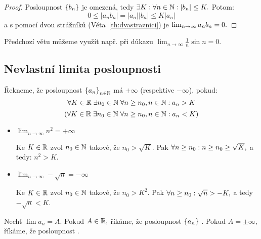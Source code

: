 \begin{proof}
    Posloupnost $\left\{b_n\right\}$ je omezená, tedy $\exists K: \forall n \in \mathbb{N}: |b_n| 
    \leq K.$ Potom:
    $$ 0 \leq |a_nb_n| = |a_n||b_n| \leq K|a_n|$$
    a s pomocí dvou strážníků (Věta~\ref{th:dvastraznici}) je 
    $\lim_{n\to\infty} a_nb_n = 0.$
\end{proof}

\begin{remark}
    Předchozí větu můžeme využít např. při důkazu 
    $\lim_{n\to\infty} {\frac{1}{n}\sin n} = 0.$
\end{remark}

\subsection{Nevlastní limita posloupnosti}

\begin{definition}
    \label{df:nevlastnilimitaposl}
    Řekneme, že posloupnost $\left\{a_n\right\}_{n \in \mathbb{N}}$ má 
    $+\infty$ (respektive $-\infty$), pokud:
    $$\forall K \in \mathbb{R} \; \exists n_0 \in \mathbb{N} \; \forall n \geq n_0, n\in \mathbb{N}: a_n > K$$
    $$(\forall K \in \mathbb{R} \; \exists n_0 \in \mathbb{N} \; \forall n \geq n_0, n\in \mathbb{N}: a_n < K)$$
\end{definition}

\begin{remark}
    \leavevmode
    \begin{itemize}
        \item $\lim_{n \to \infty} n^2 = +\infty$

            Ke $K \in \mathbb{R}$ zvol $n_0 \in \mathbb{N}$ takové, že $n_0 > \sqrt{K}.$ Pak
            $\forall n \geq n_0: n\geq n_0 \geq \sqrt{K},$ a tedy: $n^2 > K.$

        \item $\lim_{n \to \infty} -\sqrt{n} = -\infty$

            Ke $K \in \mathbb{R}$ zvol $n_0 \in \mathbb{N}$ takové, že $n_0 > K^2.$ Pak
            $\forall n \geq n_0: \sqrt{n} > -K,$ a tedy $-\sqrt{n} < K$.
    \end{itemize}
\end{remark}

\begin{definition}
    Nechť $\lim a_n = A.$ Pokud $A \in \mathbb{R},$ říkáme, že posloupnost $\left\{a_n\right\}$ 
    . Pokud $A = \pm \infty,$ říkáme, že posloupnost
    .
\end{definition}

